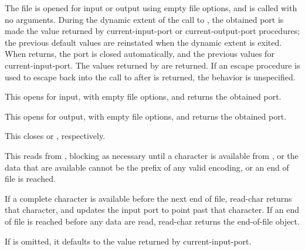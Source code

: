 \begin{entry}{%
}

  The
file is opened for input or output using empty file options, and
 is called with no arguments.  During the dynamic extent of
the call to , the obtained port is made the value returned
by {\cf current-input-port} or {\cf current-output-port} procedures;
the previous default values are reinstated when the dynamic extent is
exited.  When  returns, the port is closed automatically,
and the previous values for {\cf current-input-port}.  The values
returned by  are returned.  If an escape procedure is used
to escape back into the call to  after  is
returned, the behavior is unspecified.
\end{entry}

\begin{entry}{%
}

This opens  for input, with empty file options, and returns
the obtained port.
\end{entry}

\begin{entry}{%
}

This opens  for output, with empty file options, and
returns the obtained port.
\end{entry}

\begin{entry}{%
}

This closes  or , respectively.
\end{entry}

\begin{entry}{%
}

This reads from ,
blocking as necessary until a character
is available from ,
or the data that are available cannot
be the prefix of any valid encoding, or an end of file is reached.

If a complete character is available before the next end of file, {\cf
  read-char} returns that character, and updates the input port to
point past that character. If an end of file is
reached before any data are read, {\cf read-char} returns the
end-of-file object.

If  is omitted, it defaults to the value returned by
{\cf current-input-port}.
\end{entry}

